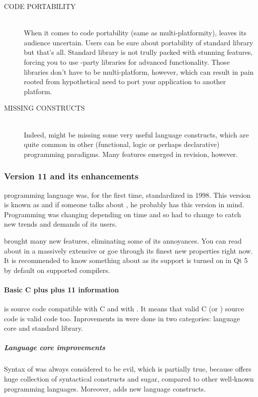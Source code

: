 \begin{description}
\item[CODE PORTABILITY\ts{\textcolor{red}{bad}}]\hfill \\
When it comes to code portability (same as multi-platformity), \cpp leaves its audience uncertain. Users can be sure about portability of \cpp standard library but that's all. Standard library is not trully packed with stunning features, forcing you to use -party libraries for advanced functionality. Those libraries don't have to be multi-platform, however, which can result in pain rooted from hypothetical need to port your application to another platform.

\item[MISSING CONSTRUCTS\ts{\textcolor{red}{bad}}]\hfill \\
Indeed, \cpp might be missing some very useful language constructs, which are quite common in other (\eg functional, logic or perhaps declarative) programming paradigms. Many features emerged in  revision, however.
\end{description}

\subsubsection{Version 11 and its enhancements}
\cpp programming language was, for the first time, standardized in 1998. This version is known as  and if someone talks about \cpp, he probably has this version in mind. Programming was changing depending on time and so \cpp had to change to catch new trends and demands of its users.

 brought many new features, eliminating some of its annoyances. You can read about  in a massively extensive \citep{various:cppstandard} or goe through its finest new properties right now. It is recommended to know something about  as its support is turned on in Qt 5 by default on supported compilers.

\paragraph{Basic C plus plus 11 information}
 is source code compatible with C and with . It means that valid C (or ) source code is valid  code too. Inprovements in \cpp were done in two categories: language core and standard library.

\subparagraph{Language core improvements}
Syntax of \cpp was always considered to be evil, which is partially true, because \cpp offers huge collection of syntactical constructs and sugar, compared to other well-known programming languages. Moreover,  adds new language constructs.

